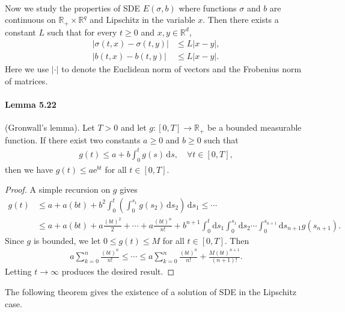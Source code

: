 \documentclass{article}
\numberwithin{equation}{section}
\newcommand{\e}{\mathrm{e}}
\renewcommand{\d}{\mathrm{d}}
\theoremstyle{plain}
\theoremstyle{definition}
\begin{document}
\paragraph{} Now we study the properties of SDE $E(\sigma,b)$ where functions $\sigma$ and $b$ are continuous on $\mathbb{R}_+\times\mathbb{R}^q$ and Lipschitz in the variable $x$. Then there exists a constant $L$ such that for every $t\geq 0$ and $x,y\in\mathbb{R}^d$,
\begin{align*}
	\vert\sigma(t,x)-\sigma(t,y)\vert&\leq L\vert x-y\vert,\\
	\vert b(t,x)-b(t,y)\vert&\leq L\vert x-y\vert.
\end{align*}
Here we use $\vert\cdot\vert$ to denote the Euclidean norm of vectors and the Frobenius norm of matrices.
\paragraph{Lemma 5.22\label{lemma:5.22}} (Gronwall's lemma). Let $T>0$ and let $g:[0,T]\to\mathbb{R}_+$ be a bounded
measurable function. If there exist two constants $a\geq 0$ and $b\geq 0$ such that
\begin{align*}
	g(t)\leq a+b\int_0^t g(s)\,\d s,\quad\forall t\in[0,T],
\end{align*}
then we have $g(t)\leq a\e^{bt}$ for all $t\in[0,T]$.
\begin{proof}
A simple recursion on $g$ gives
\begin{align*}
	g(t)&\leq a + a(bt) + b^2\int_0^t\left(\int_0^{s_1} g(s_2)\,\d s_2\right)\,\d s_1\leq\cdots\\
	& \leq a + a(bt) + a\frac{(bt)^2}{2} +\cdots + a\frac{(bt)^n}{n!} + b^{n+1}\int_0^t\d s_1\int_0^{s_1}\d s_2\cdots\int_0^{s_{n+1}}\d s_{n+1} g(s_{n+1}).
\end{align*}
Since $g$ is bounded, we let $0\leq g(t)\leq M$ for all $t\in[0,T]$. Then
\begin{align*}
	a\sum_{k=0}^{n}\frac{(bt)^n}{n!}\leq\cdots\leq a\sum_{k=0}^{n}\frac{(bt)^n}{n!} + \frac{M(bt)^{n+1}}{(n+1)!}.
\end{align*}
Letting $t\to\infty$ produces the desired result.
\end{proof}

The following theorem gives the existence of a solution of SDE in the Lipschitz case.
\end{document}
